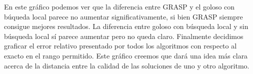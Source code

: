\begin{figure}[H]
    \begin{minipage}[t]{\linewidth}
		\centering
		\label{fig:ejercicio-6-comparacion-calidad-sin-exacto}
    \end{minipage}
\end{figure}

En este gráfico podemos ver que la diferencia entre GRASP y el goloso con búqueda local
parece no aumentar significativamente, si bien GRASP siempre consigue mejores resultados. La
diferencia entre goloso con búsqueda local y sin búsqueda local sí parece aumentar pero no queda
claro.
Finalmente decidimos graficar el error relativo presentado por todos los algoritmos con respecto al
exacto en el rango permitido. Este gráfico creemos que dará una idea más clara acerca de la distancia
entre la calidad de las soluciones de uno y otro algoritmo.

\begin{figure}[H]
    \begin{minipage}[t]{\linewidth}
		\centering
		\label{fig:ejercicio-6-comparacion-calidad-error-relativo}
    \end{minipage}
\end{figure}

